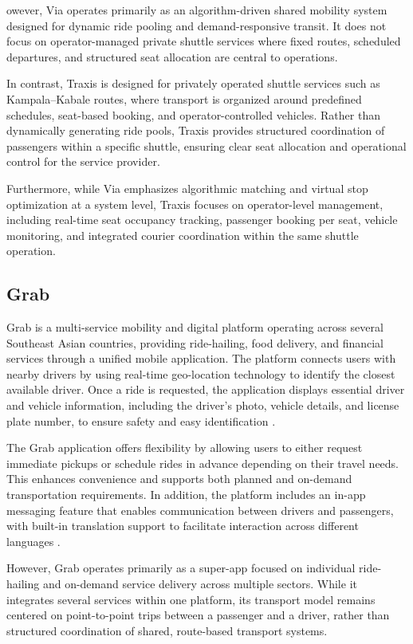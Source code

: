 owever, Via operates primarily as an algorithm-driven shared mobility system
designed for dynamic ride pooling and demand-responsive transit. It does not
focus on operator-managed private shuttle services where fixed routes, scheduled
departures, and structured seat allocation are central to operations.


In contrast, Traxis is designed for privately operated shuttle services such as
Kampala–Kabale routes, where transport is organized around predefined schedules,
seat-based booking, and operator-controlled vehicles. Rather than dynamically
generating ride pools, Traxis provides structured coordination of passengers
within a specific shuttle, ensuring clear seat allocation and operational
control for the service provider.


Furthermore, while Via emphasizes algorithmic matching and virtual stop
optimization at a system level, Traxis focuses on operator-level management,
including real-time seat occupancy tracking, passenger booking per seat, vehicle
monitoring, and integrated courier coordination within the same shuttle
operation.


\subsection{Grab}
Grab is a multi-service mobility and digital platform operating across several
Southeast Asian countries, providing ride-hailing, food delivery, and financial
services through a unified mobile application. The platform connects users with
nearby drivers by using real-time geo-location technology to identify the
closest available driver. Once a ride is requested, the application displays
essential driver and vehicle information, including the driver’s photo, vehicle
details, and license plate number, to ensure safety and easy identification
\cite{Wu2025GrabBusinessModel}.


The Grab application offers flexibility by allowing users to either request
immediate pickups or schedule rides in advance depending on their travel needs.
This enhances convenience and supports both planned and on-demand transportation
requirements. In addition, the platform includes an in-app messaging feature
that enables communication between drivers and passengers, with built-in
translation support to facilitate interaction across different languages
\cite{jugnoo2022grabmodel}.


However, Grab operates primarily as a super-app focused on individual ride-
hailing and on-demand service delivery across multiple sectors. While it
integrates several services within one platform, its transport model remains
centered on point-to-point trips between a passenger and a driver, rather than
structured coordination of shared, route-based transport systems.


